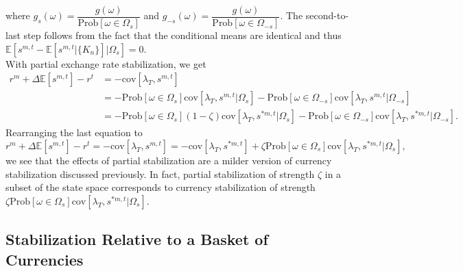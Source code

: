where $g_s(\omega) = \dfrac{g(\omega)}{\text{Prob}\left[\omega\in\Omega_s\right]}$ and $g_{-s}(\omega) = \dfrac{g(\omega)}{\text{Prob}\left[\omega\in\Omega_{-s}\right]}$. The second-to-last step follows from the fact that the conditional means are identical and thus $\mathbb{E}\left[s^{m,t}-\mathbb{E}\left[s^{m,t}|\{K_n\}\right]|\Omega_s \right] = 0$.\\
With partial exchange rate stabilization, we get
\begin{equation*}
  \begin{split}
    r^m+ \Delta \mathbb{E}[s^{m,t}]-r^t&=-\text{cov}\left[\lambda_T,s^{m,t}\right]\\
    &= -\text{Prob}\left[\omega\in\Omega_s\right] \text{cov}\left[\lambda_T,s^{m,t}|\Omega_s\right]-\text{Prob}\left[\omega\in\Omega_{-s}\right] \text{cov}\left[\lambda_T,s^{m,t}|\Omega_{-s}\right]\\
    &= -\text{Prob}\left[\omega\in\Omega_s\right]
    (1-\zeta)\text{cov}\left[\lambda_T,s^{\ast m,t}|\Omega_s\right]
    -\text{Prob}\left[\omega\in\Omega_{-s}\right]
    \text{cov}\left[\lambda_T,s^{\ast m,t}|\Omega_{-s}\right].
  \end{split}
\end{equation*}
Rearranging the last equation to
\begin{equation*}
  r^m+\Delta \mathbb{E}[s^{m,t}]-r^t=-\text{cov}\left[\lambda_T,s^{m,t}\right]=  -\text{cov}\left[\lambda_T,s^{\ast m,t}\right] +\zeta \text{Prob}\left[\omega\in\Omega_s\right]\text{cov}\left[\lambda_T,s^{\ast m,t}|\Omega_s\right],
\end{equation*}
we see that the effects of partial stabilization are a milder version
of currency stabilization discussed previously. In fact, partial
stabilization of strength $\zeta$ in a subset of the state space
corresponds to currency stabilization of strength
$\zeta
\text{Prob}\left[\omega\in\Omega_s\right]\text{cov}\left[\lambda_T,s^{\ast
    m,t}|\Omega_s\right]$.

\subsection{Stabilization Relative to a Basket of
  Currencies\label{Appendix_baskets}}

